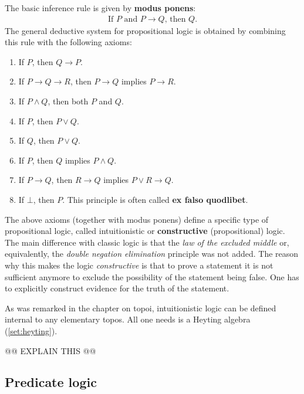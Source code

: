     The basic inference rule is given by \textbf{modus ponens}:
    \begin{gather}
        \text{If } P \text{ and } P\rightarrow Q \text{, then } Q.
    \end{gather}
    The general deductive system for propositional logic is obtained by combining this rule with the following axioms:
    \begin{enumerate}
        \item If $P$, then $Q\rightarrow P$.
        \item If $P\rightarrow Q \rightarrow R$, then $P\rightarrow Q$ implies $P\rightarrow R$.
        \item If $P\land Q$, then both $P$ and $Q$.
        \item If $P$, then $P\lor Q$.
        \item If $Q$, then $P\lor Q$.
        \item If $P$, then $Q$ implies $P\land Q$.
        \item If $P\rightarrow Q$, then $R\rightarrow Q$ implies $P\lor R\rightarrow Q$.
        \item If $\bot$, then $P$. This principle is often called \textbf{ex falso quodlibet}.
    \end{enumerate}

    \begin{remark}
        The above axioms (together with modus ponens) define a specific type of propositional logic, called intuitionistic or \textbf{constructive} (propositional) logic. The main difference with classic logic is that the \textit{law of the excluded middle} or, equivalently, the \textit{double negation elimination} principle was not added. The reason why this makes the logic \textit{constructive} is that to prove a statement it is not sufficient anymore to exclude the possibility of the statement being false. One has to explicitly construct evidence for the truth of the statement.

        As was remarked in the chapter on topoi, intuitionistic logic can be defined internal to any elementary topos. All one needs is a Heyting algebra (\cref{set:heyting}).
        
        @@ EXPLAIN THIS @@
    \end{remark}

\subsection{Predicate logic}


